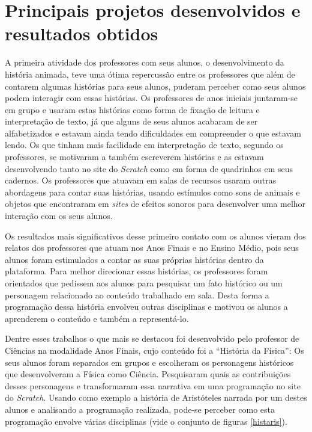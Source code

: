 \documentclass[12pt, openright, a4paper, brazil, english, french, spanish, bibjustif, openany, oneside]{abntex2}
\begin{document}
\section{Principais projetos desenvolvidos e resultados obtidos}

A primeira atividade dos professores com seus alunos, o desenvolvimento da história animada, teve uma ótima repercussão entre os professores que além de contarem algumas histórias para seus alunos, puderam perceber como seus alunos podem interagir com essas histórias. Os professores de anos iniciais juntaram-se em grupo e usaram estas histórias como forma de fixação de leitura e interpretação de texto, já que alguns de seus alunos acabaram de ser alfabetizados e estavam ainda tendo dificuldades em compreender o que estavam lendo. Os que tinham mais facilidade em interpretação de texto, segundo os professores, se motivaram a também escreverem histórias e as estavam desenvolvendo tanto no site do \textit{Scratch} como em forma de quadrinhos em seus cadernos. Os professores que atuavam em salas de recursos usaram outras abordagens para contar suas histórias, usando estímulos como sons de animais e objetos que encontraram em \textit{sites} de efeitos sonoros para desenvolver uma melhor interação com os seus alunos.

Os resultados mais significativos desse primeiro contato com os alunos vieram dos relatos dos professores que atuam nos Anos Finais e no Ensino Médio, pois seus alunos foram estimulados a contar as suas próprias histórias dentro da plataforma. Para melhor direcionar essas histórias, os professores foram orientados que pedissem aos alunos para pesquisar um fato histórico ou um personagem relacionado ao conteúdo trabalhado em sala. Desta forma a programação dessa história envolveu outras disciplinas e motivou os alunos a aprenderem o conteúdo e também a representá-lo. 

Dentre esses trabalhos o que mais se destacou foi desenvolvido pelo professor de Ciências na modalidade Anos Finais, cujo conteúdo foi a ``História da Física'': Os seus alunos foram separados em grupos e escolheram os personagens históricos que desenvolveram a Física como Ciência. Pesquisaram quais as contribuições desses personagens e transformaram essa narrativa em uma programação no site do \textit{Scratch}. Usando como exemplo a história de Aristóteles narrada por um destes alunos e analisando a programação realizada, pode-se perceber como esta programação envolve várias disciplinas (vide o conjunto de figuras \ref{histaris}).
\end{document}
